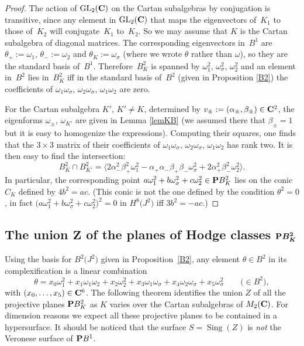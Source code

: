 \documentclass[pdftex]{sigma}
\numberwithin{equation}{section}
\begin{document}
\begin{proof}The action of ${\rm GL}_2({\bf C})$ on the Cartan subalgebras by conjugation is transitive,
since any element in ${\rm GL}_2({\bf C})$ that maps the eigenvectors of~$K_1$ to those of~$K_2$
will conjugate~$K_1$ to~$K_2$.
So we may assume that $K$ is the Cartan subalgebra of diagonal matrices.
The corresponding eigenvectors in~$B^1$ are
$\theta_+:=\omega_1$, $\theta_-:=\omega_2$
and $\theta_K:=\omega_\sigma$ (where we wrote $\theta$ rather than $\omega$),
so they are the standard basis of~$B^1$.
Therefore~$B^2_K$ is spanned by $\omega_1^2$, $\omega_\sigma^2$, $\omega_2^2$
and an element in~$B^2$ lies in~$B^2_K$ iff in the standard basis of~$B^2$ (given in
Proposition \ref{B2}) the coefficients of
$\omega_1\omega_\sigma$, $\omega_2\omega_\sigma$, $\omega_1\omega_2$ are zero.

For the Cartan subalgebra $K'$, $K'\neq K$, determined by $v_\pm:=(\alpha_\pm,\beta_\pm)\in{\bf C}^2$,
the eigenforms $\omega_\pm$, $\omega_{K'}$ are given in Lemma \ref{lemKB}
(we assumed there that $\beta_\pm=1$ but it is easy to homogenize the expressions).
Computing their squares, one finds that the $3\times 3$ matrix
of their coefficients of
$\omega_1\omega_\sigma$, $\omega_2\omega_\sigma$, $\omega_1\omega_2$ has rank two.
It is then easy to find the intersection:
\[
B^2_K\cap B^2_{K'} =
\big\langle 2\alpha_-^2\beta_+^2\omega_1^2 -
\alpha_+\alpha_-\beta_+\beta_-\omega_\sigma^2 + 2\alpha_+^2\beta_-^2\omega_2^2 \big\rangle.
\]
In particular, the corresponding point $a\omega_1^2+b\omega_\sigma^2+c\omega_2^2\in {\bf P} B_K^2$
lies on the conic $C_K$ defined by $4b^2=ac$.
(This conic is not the one defined by the condition $\theta^2=0$,
in fact $\big(a\omega_1^2+b\omega_\sigma^2+c\omega_2^2\big)^2=0$ in $H^8\big(J^2\big)$ iff $3b^2=-ac$.)
\end{proof}

\subsection[The union Z of the planes of Hodge classes PB\_K\^{}2]{The union $\boldsymbol{Z}$ of the planes of Hodge classes $\boldsymbol{{\bf P} B_K^2}$}\label{unz}

Using the basis for $B^2\big(J^2\big)$ given in Proposition~\ref{B2},
any element $\theta \in B^2$ in its complexification is a linear combination
\[
\theta =
x_0\omega_1^2+x_1\omega_1\omega_2+ x_2\omega_2^2 + x_3\omega_1\omega_\sigma +
x_4\omega_2\omega_\sigma + x_5\omega_\sigma^2\qquad\big(\!\!\in B^2\big),
\]
with $(x_0,\dots,x_5)\in{\bf C}^6$.
The following theorem identifies the union $Z$ of all the projective planes ${\bf P} B^2_K$
as $K$ varies over the Cartan subalgebras of $M_2({\bf C})$.
For dimension reasons we expect all these projective planes to be contained in a hypersurface.
It should be noticed that the surface $S=\operatorname{Sing}(Z)$ is \emph{not} the Veronese surface
of ${\bf P} B^1$.
\end{document}
